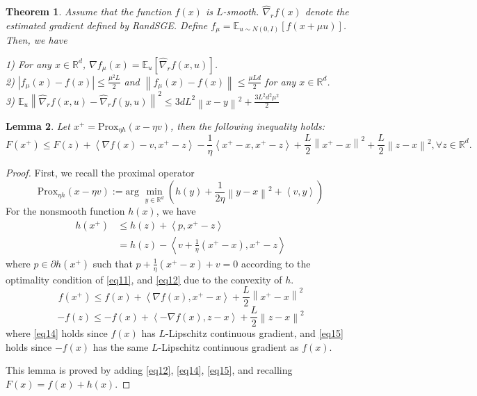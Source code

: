 \documentclass{article}
\newcommand*{\R}{\mathbb{R}}
\newcommand*{\Po}{\text{Prox}}
\newcommand*{\E}{\mathbb{E}}
\newcommand{\norm}[1]{\left\lVert#1\right\rVert}
\newcommand{\abs}[1]{\left|#1\right|}
\newcommand{\Iprod}[2]{\left\langle #1,#2\right\rangle}
\newtheorem{theorem}{Theorem}[section]
\newtheorem{lemma}[theorem]{Lemma}
\theoremstyle{definition}
\theoremstyle{remark}
\begin{document}
{\color{Sepia}
\begin{theorem}\label{SGERand-approx}
Assume that the function $f(x)$ is $L$-smooth. $\hat{\nabla}_r f(x)$ denote the estimated gradient defined by RandSGE. Define $f_{\mu} = \E_{u\sim N(0, I)}[f(x+\mu u)]$. Then, we have 

1) For any $x \in \R^d$, $\nabla f_{\mu}(x) = \E_u[\hat{\nabla}_r f(x,u)]$.\\
2) $\abs{f_{\mu}(x) - f(x)} \leq \frac{\mu^2 L}{2}$ and 
$\norm{f_{\mu}(x) - f(x)} \leq \frac{\mu L d}{2}$ for any $x \in \R^d$.\\
3) $\E_{u}\norm{\hat{\nabla}_r f(x,u) - \hat{\nabla}_r f(y,u)}^2 \leq 3dL^2\norm{x-y}^2 + \frac{3L^2d^2\mu^2}{2}$
\end{theorem}
}

\begin{lemma}\label{lemma1}
Let $x^+ = \Po_{\eta h}(x-\eta v)$, then the following inequality holds:
\begin{equation}\label{eq10}
F(x^+) \leq F(z) + \Iprod{\nabla f(x)-v}{x^+-z}-\frac{1}{\eta} \Iprod{x^+-x}{x^+-z}+\frac{L}{2}\norm{x^+-x}^2+\frac{L}{2}\norm{z-x}^2, \forall z\in \R^d. 
\end{equation}
\end{lemma}
\begin{proof}
First, we recall the proximal operator 
\begin{equation}\label{eq11}
\Po_{\eta h}(x-\eta v) := \text{arg}\,\,\min_{y\in\R^d}\left(h(y)+\frac{1}{2\eta}\norm{y-x}^2+\Iprod{v}{y}\right)
\end{equation}
For the nonsmooth function $h(x)$, we have 
\begin{equation}\label{eq12}
\begin{split}
h(x^+) &\leq h(z) + \Iprod{p}{x^+-z}\\
&= h(z) - \Iprod{v+\frac{1}{\eta}(x^+-x)}{x^+-z}
\end{split}
\end{equation}
where $p\in \partial h(x^+)$ such that $p+\frac{1}{\eta}(x^+-x)+v = 0$ according to the optimality condition of \eqref{eq11}, and \eqref{eq12} due to the convexity of $h$.
\begin{equation}\label{eq14}
f(x^+) \leq f(x)+\Iprod{\nabla f(x)}{x^+-x}+\frac{L}{2}\norm{x^+-x}^2
\end{equation}
\begin{equation}\label{eq15}
-f(z) \leq -f(x)+\Iprod{-\nabla f(x)}{z-x}+\frac{L}{2}\norm{z-x}^2
\end{equation}
where \eqref{eq14} holds since $f(x)$ has $L$-Lipschitz continuous gradient, and \eqref{eq15} holds since $-f(x)$ has the same $L$-Lipschitz continuous gradient as $f(x)$. 

 This lemma is proved by adding \eqref{eq12}, \eqref{eq14}, \eqref{eq15}, and recalling $F(x) = f(x)+h(x)$. 
\end{proof}
\end{document}
